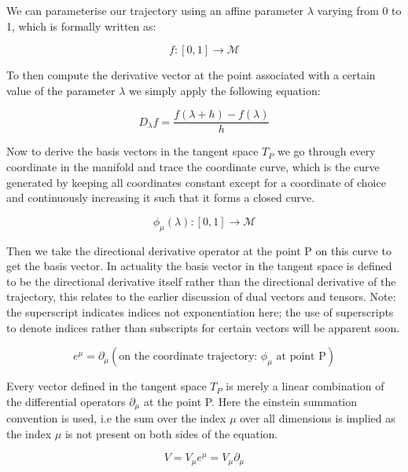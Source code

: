 \documentclass{article}
\begin{document}
  We can parameterise our trajectory using an affine parameter $\lambda$ varying from 0 to 1, which is formally written as:
  
  \begin{equation*}
    f: [0, 1] \rightarrow \mathcal M
  \end{equation*}

  To then compute the derivative vector at the point associated with a certain value of the parameter $\lambda$ we simply apply the following equation:

  \begin{equation*}
    D_\lambda f = \frac{f(\lambda+h) - f(\lambda)}{h}
  \end{equation*}

  Now to derive the basis vectors in the tangent space $T_P$ we go through every coordinate in the manifold and trace the coordinate curve, which is the curve generated by keeping all coordinates constant except for a coordinate of choice and continuously increasing it such that it forms a closed curve. 

  \begin{equation*}
    \phi_\mu(\lambda): [0,1] \rightarrow \mathcal M
  \end{equation*}

  Then we take the directional derivative operator at the point P on this curve to get the basis vector. In actuality the basis vector in the tangent space is defined to be the directional derivative itself rather than the directional derivative of the trajectory, this relates to the earlier discussion of dual vectors and tensors. Note: the superscript indicates indices not exponentiation here; the use of superscripts to denote indices rather than subscripts for certain vectors will be apparent soon.

  \begin{equation*}
    e^\mu = \partial_\mu (\text{on the coordinate trajectory: } \phi_\mu \text{ at point P})
  \end{equation*}

  Every vector defined in the tangent space $T_P$ is merely a linear combination of the differential operators $\partial_\mu$ at the point P. Here the einstein summation convention is used, i.e the sum over the index $\mu$ over all dimensions is implied as the index $\mu$ is not present on both sides of the equation.

  \begin{equation*}
    V = V_{\mu} e^{\mu} = V_{\mu} \partial_{\mu}
  \end{equation*}
\end{document}
